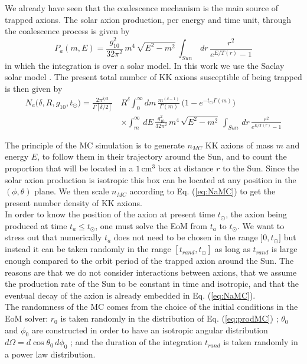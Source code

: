 \documentclass[a4paper]{article} %
\begin{document}
We already have seen that the coalescence mechanism is the main source of trapped axions. The solar axion production, per energy and time unit, through the coalescence process is given by
\begin{equation}
	P_a(m, E) = \frac{g_{10}^2}{32\pi^2}\,m^4\,\sqrt{E^2 - m^2}\,\int_{Sun}\,dr\, \frac{r^2}{e^{E/T(r)} -1}
	\label{eq:prodMC}
\end{equation}
in which the integration is over a solar model. In this work we use the Saclay solar model \cite{SaclayModel}. The present total number of KK axions susceptible of being trapped is then given by
\begin{equation}
\begin{split}
	N_a\big(\delta, R, g_{10}, t_\odot\big) = \frac{2\pi^{\delta/2}}{\Gamma[\delta/2]}\,&R^{\delta}\int_0^\infty dm \,  \frac{m^{(\delta-1)}}{\Gamma(m)}\,\bigg(1-e^{-t_\odot\Gamma(m)}\bigg) \\
	& \times \int_m^\infty \, dE\, \frac{g_{10}^2}{32\pi^2}\,m^4\,\sqrt{E^2 - m^2}\,\int_{Sun}\,dr\, \frac{r^2}{e^{E/T(r)} -1}
\end{split}
\label{eq:NaMC}
\end{equation}

The principle of the MC simulation is to generate $n_{MC}$ KK axions of mass $m$ and energy $E$, to follow them in their trajectory around the Sun, and to count the proportion that will be located in a $1\,\mathrm{cm^3}$ box at distance $r$ to the Sun. Since the solar axion production is isotropic this box can be located at any position in the $(\phi, \theta)$ plane. We then scale $n_{MC}$ according to Eq. (\ref{eq:NaMC}) to get the present number density of KK axions.\\

In order to know the position of the axion at present time $t_\odot$, the axion being produced at time $t_a \leq t_\odot$, one must solve the EoM from $t_a$ to $t_\odot$. We want to stress out that numerically $t_a$ does not need to be chosen in the range $]0, t_\odot]$ but instead it can be taken randomly in the range $[t_{rand}, t_\odot]$ as long as $t_{rand}$ is large enough compared to the orbit period of the trapped axion around the Sun. The reasons are that we do not consider interactions between axions, that we assume the production rate of the Sun to be constant in time and isotropic, and that the eventual decay of the axion is already embedded in Eq. (\ref{eq:NaMC}).\\

The randomness of the MC comes from the choice of the initial conditions in the EoM solver: $r_0$ is taken randomly in the distribution of Eq. (\ref{eq:prodMC}) ; $\theta_0$ and $\phi_0$ are constructed in order to have an isotropic angular distribution $d\Omega=d\cos\theta_0 \, d\phi_0$ ; and the duration of the integration $t_{rand}$ is taken randomly in a power law distribution.\\
\end{document}
